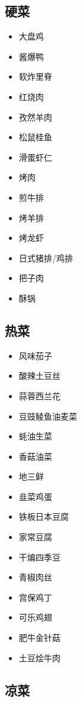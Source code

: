 \documentclass[
  letterpaper,
  DIV=11,
  numbers=noendperiod]{scrreprt}
\providecommand{\tightlist}{%
  \setlength{\itemsep}{0pt}\setlength{\parskip}{0pt}}\usepackage{longtable,booktabs,array}
\begin{document}
\subsection{硬菜}\label{ux786cux83dc}

\begin{itemize}
\tightlist
\item
  大盘鸡
\item
  酱爆鸭
\item
  软炸里脊
\item
  红烧肉
\item
  孜然羊肉
\item
  松鼠桂鱼
\item
  滑蛋虾仁
\item
  烤肉
\item
  煎牛排
\item
  烤羊排
\item
  烤龙虾
\item
  日式猪排/鸡排
\item
  把子肉
\item
  酥锅
\end{itemize}

\subsection{热菜}\label{ux70edux83dc}

\begin{itemize}
\tightlist
\item
  风味茄子
\item
  酸辣土豆丝
\item
  蒜蓉西兰花
\item
  豆豉鲮鱼油麦菜
\item
  蚝油生菜
\item
  香菇油菜
\item
  地三鲜
\item
  韭菜鸡蛋
\item
  铁板日本豆腐
\item
  家常豆腐
\item
  干煸四季豆
\item
  青椒肉丝
\item
  宫保鸡丁
\item
  可乐鸡翅
\item
  肥牛金针菇
\item
  土豆烩牛肉
\end{itemize}

\subsection{凉菜}\label{ux51c9ux83dc-1}
\end{document}
